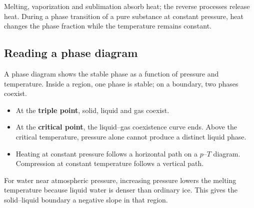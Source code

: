 \documentclass[a4paper,10pt]{article}
\begin{document}
\begin{center}
\end{center}
Melting, vaporization and sublimation absorb heat; the reverse processes release
heat. During a phase transition of a pure substance at constant pressure,
heat changes the phase fraction while the temperature remains constant.

\subsection{Reading a phase diagram}
A phase diagram shows the stable phase as a function of pressure and temperature.
Inside a region, one phase is stable; on a boundary, two phases coexist.
\begin{itemize}
  \item At the \textbf{triple point}, solid, liquid and gas coexist.
  \item At the \textbf{critical point}, the liquid--gas coexistence curve ends.
  Above the critical temperature, pressure alone cannot produce a distinct liquid phase.
  \item Heating at constant pressure follows a horizontal path on a $p$--$T$ diagram.
  Compression at constant temperature follows a vertical path.
\end{itemize}
For water near atmospheric pressure, increasing pressure lowers the melting
temperature because liquid water is denser than ordinary ice. This gives the
solid--liquid boundary a negative slope in that region.
\end{document}

